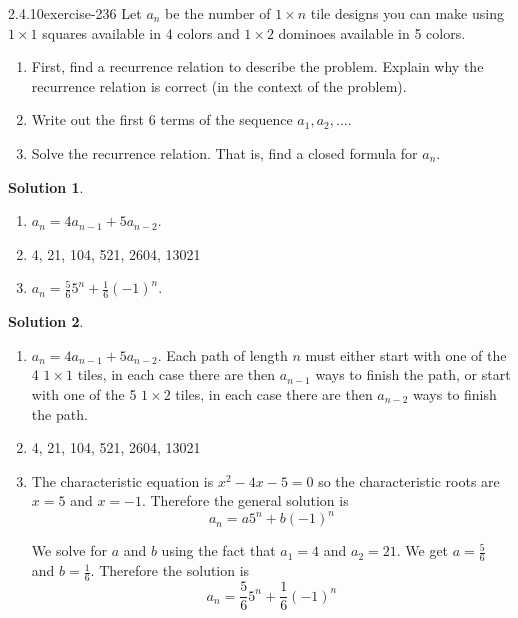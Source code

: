 \documentclass[twoside,11pt,]{book}
\numberwithin{equation}{chapter}
\begin{document}
\begin{divisionsolution}{2.4.10}{}{exercise-236}%
\hypertarget{p-3457}{}%
Let \(a_n\) be the number of \(1 \times n\) tile designs you can make using \(1 \times 1\) squares available in 4 colors and \(1 \times 2\) dominoes available in 5 colors.\leavevmode%
\begin{enumerate}[label=(\alph*)]
\item\hypertarget{li-1946}{}\hypertarget{p-3458}{}%
First, find a recurrence relation to describe the problem. Explain why the recurrence relation is correct (in the context of the problem).%
\item\hypertarget{li-1947}{}\hypertarget{p-3459}{}%
Write out the first 6 terms of the sequence \(a_1, a_2, \ldots\).%
\item\hypertarget{li-1948}{}\hypertarget{p-3460}{}%
Solve the recurrence relation. That is, find a closed formula for \(a_n\).%
\end{enumerate}
%
\par\smallskip%
\noindent\textbf{Solution 1}.\quad%
\hypertarget{p-3461}{}%
\leavevmode%
\begin{enumerate}[label=(\alph*)]
\item\hypertarget{li-1949}{}\hypertarget{p-3462}{}%
\(a_n = 4a_{n-1} + 5a_{n-2}\).%
\item\hypertarget{li-1950}{}\hypertarget{p-3463}{}%
4, 21, 104, 521, 2604, 13021%
\item\hypertarget{li-1951}{}\hypertarget{p-3464}{}%
\(a_n = \frac{5}{6} 5^n + \frac{1}{6}(-1)^n\).%
\end{enumerate}
%
\par\smallskip%
\noindent\textbf{Solution 2}.\quad%
\hypertarget{p-3465}{}%
\leavevmode%
\begin{enumerate}[label=(\alph*)]
\item\hypertarget{li-1952}{}\hypertarget{p-3466}{}%
\(a_n = 4a_{n-1} + 5a_{n-2}\). Each path of length \(n\) must either start with one of the 4 \(1\times 1\) tiles, in each case there are then \(a_{n-1}\) ways to finish the path, or start with one of the 5 \(1\times 2\) tiles, in each case there are then \(a_{n-2}\) ways to finish the path.%
\item\hypertarget{li-1953}{}\hypertarget{p-3467}{}%
4, 21, 104, 521, 2604, 13021%
\item\hypertarget{li-1954}{}\hypertarget{p-3468}{}%
The characteristic equation is \(x^2 - 4x - 5 = 0\) so the characteristic roots are \(x = 5\) and \(x = -1\). Therefore the general solution is%
\begin{equation*}
a_n = a 5^n + b (-1)^n
\end{equation*}
%
\par
\hypertarget{p-3469}{}%
We solve for \(a\) and \(b\) using the fact that \(a_1 = 4\) and \(a_2 = 21\). We get \(a = \frac{5}{6}\) and \(b = \frac{1}{6}\). Therefore the solution is%
\begin{equation*}
a_n = \frac{5}{6} 5^n + \frac{1}{6}(-1)^n
\end{equation*}
%
\end{enumerate}
%
\end{divisionsolution}%
\end{document}

